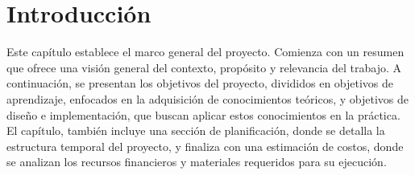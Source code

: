 \chapter{Introducción}

Este capítulo establece el marco general del proyecto. Comienza con un resumen que ofrece una visión general del contexto, propósito y relevancia del trabajo. A continuación, se presentan los objetivos del proyecto, divididos en objetivos de aprendizaje, enfocados en la adquisición de conocimientos teóricos, y objetivos de diseño e implementación, que buscan aplicar estos conocimientos en la práctica. El capítulo, también incluye una sección de planificación, donde se detalla la estructura temporal del proyecto, y finaliza con una estimación de costos, donde se analizan los recursos financieros y materiales requeridos para su ejecución.

